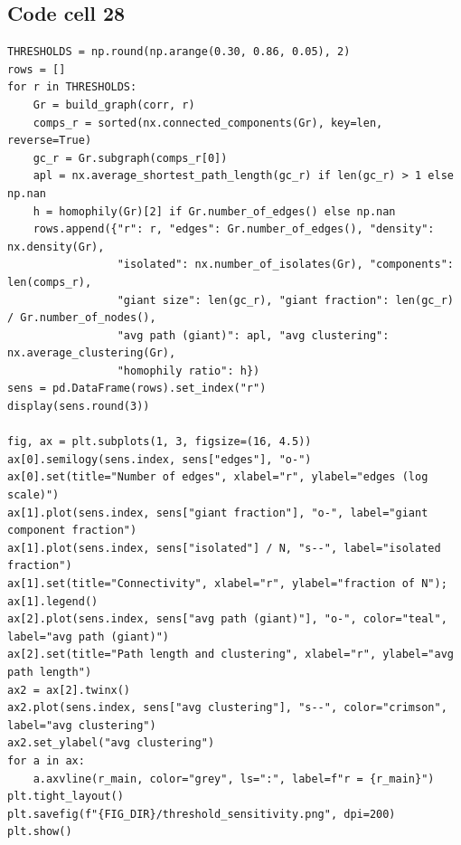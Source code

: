 \documentclass[12pt,a4paper]{report}
\begin{document}
\subsection*{Code cell 28}
\begin{lstlisting}[style=fancy]
THRESHOLDS = np.round(np.arange(0.30, 0.86, 0.05), 2)
rows = []
for r in THRESHOLDS:
    Gr = build_graph(corr, r)
    comps_r = sorted(nx.connected_components(Gr), key=len, reverse=True)
    gc_r = Gr.subgraph(comps_r[0])
    apl = nx.average_shortest_path_length(gc_r) if len(gc_r) > 1 else np.nan
    h = homophily(Gr)[2] if Gr.number_of_edges() else np.nan
    rows.append({"r": r, "edges": Gr.number_of_edges(), "density": nx.density(Gr),
                 "isolated": nx.number_of_isolates(Gr), "components": len(comps_r),
                 "giant size": len(gc_r), "giant fraction": len(gc_r) / Gr.number_of_nodes(),
                 "avg path (giant)": apl, "avg clustering": nx.average_clustering(Gr),
                 "homophily ratio": h})
sens = pd.DataFrame(rows).set_index("r")
display(sens.round(3))

fig, ax = plt.subplots(1, 3, figsize=(16, 4.5))
ax[0].semilogy(sens.index, sens["edges"], "o-")
ax[0].set(title="Number of edges", xlabel="r", ylabel="edges (log scale)")
ax[1].plot(sens.index, sens["giant fraction"], "o-", label="giant component fraction")
ax[1].plot(sens.index, sens["isolated"] / N, "s--", label="isolated fraction")
ax[1].set(title="Connectivity", xlabel="r", ylabel="fraction of N"); ax[1].legend()
ax[2].plot(sens.index, sens["avg path (giant)"], "o-", color="teal", label="avg path (giant)")
ax[2].set(title="Path length and clustering", xlabel="r", ylabel="avg path length")
ax2 = ax[2].twinx()
ax2.plot(sens.index, sens["avg clustering"], "s--", color="crimson", label="avg clustering")
ax2.set_ylabel("avg clustering")
for a in ax:
    a.axvline(r_main, color="grey", ls=":", label=f"r = {r_main}")
plt.tight_layout()
plt.savefig(f"{FIG_DIR}/threshold_sensitivity.png", dpi=200)
plt.show()
\end{lstlisting}
\end{document}
